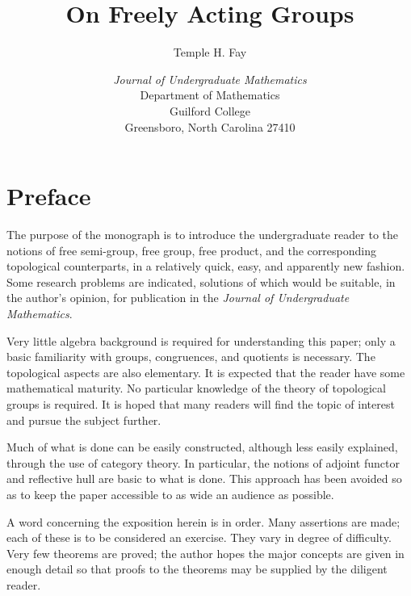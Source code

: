 \documentclass{article}
\let\titlepageAuthor\author
\renewcommand{\author}[1]{\newcommand{\headerAuthor}{#1}\titlepageAuthor{#1}}
\let\titlepageTitle\title
\renewcommand{\title}[1]{\newcommand{\headerTitle}{#1}\titlepageTitle{#1}}
\begin{document}
\title{On Freely Acting Groups}
\author{Temple H. Fay}
\date{\vspace{3cm}
\emph{Journal of Undergraduate Mathematics}
  \\ Department of Mathematics
  \\ Guilford College
  \\ Greensboro, North Carolina 27410 
  }
\maketitle
\thispagestyle{empty}



\newpage

\setcounter{tocdepth}{3} 
\tableofcontents
\thispagestyle{empty}


\newpage

\section*{Preface}


The purpose of the monograph is to introduce the undergraduate reader to the notions of free semi-group, free group, free product, and the corresponding topological counterparts, in a relatively quick, easy, and apparently new fashion. Some research problems are indicated, solutions of which would be suitable, in the author's opinion, for publication in the \emph{Journal of Undergraduate Mathematics}.

Very little algebra background is required for understanding this paper; only a basic familiarity with groups, congruences, and quotients is necessary. The topological aspects are also elementary. It is expected that the reader have some mathematical maturity. No particular knowledge of the theory of topological groups is required. It is hoped that many readers will find the topic of interest and pursue the subject further.

Much of what is done can be easily constructed, although less easily explained, through the use of category theory. In particular, the notions of adjoint functor and reflective hull are basic to what is done. This approach has been avoided so as to keep the paper accessible to as wide an audience as possible.

A word concerning the exposition herein is in order. Many assertions are made; each of these is to be considered an exercise. They vary in degree of difficulty. Very few theorems are proved; the author hopes the major concepts are given in enough detail so that proofs to the theorems may be supplied by the diligent reader.
\end{document}
